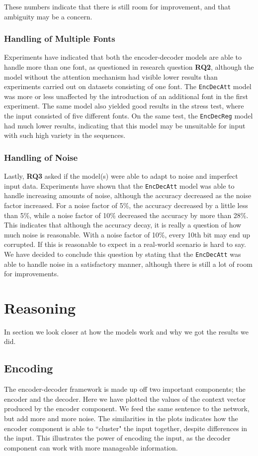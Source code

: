 These numbers indicate that there is still room for improvement, and that ambiguity may be a concern.

\subsubsection{Handling of Multiple Fonts}
Experiments have indicated that both the encoder-decoder models are able to handle more than one font, as questioned in research question \textbf{RQ2}, although the model without the attention mechanism had visible lower results than experiments carried out on datasets consisting of one font. The {\tt EncDecAtt} model was more or less unaffected by the introduction of an additional font in the first experiment. The same model also yielded good results in the stress test, where the input consisted of five different fonts. On the same test, the {\tt EncDecReg} model had much lower results, indicating that this model may be unsuitable for input with such high variety in the sequences.

\subsubsection{Handling of Noise}
Lastly, \textbf{RQ3} asked if the model(s) were able to adapt to noise and imperfect input data. Experiments have shown that the {\tt EncDecAtt} model was able to handle increasing amounts of noise, although the accuracy decreased as the noise factor increased. For a noise factor of 5\%, the accuracy decreased by a little less than 5\%, while a noise factor of 10\% decreased the accuracy by more than 28\%. This indicates that although the accuracy decay, it is really a question of how much noise is reasonable. With a noise factor of 10\%, every 10th bit may end up corrupted. If this is reasonable to expect in a real-world scenario is hard to say. We have decided to conclude this question by stating that the {\tt EncDecAtt} was able to handle noise in a satisfactory manner, although there is still a lot of room for improvements.


\section{Reasoning}
\label{sec:reasoning}
In section we look closer at how the models work and why we got the results we did. 

\subsection{Encoding}
The encoder-decoder framework is made up off two important components; the encoder and the decoder. Here we have plotted the values of the context vector produced by the encoder component. We feed the same sentence to the network, but add more and more noise. The similarities in the plots indicates how the encoder component is able to ``cluster" the input together, despite differences in the input. This illustrates the power of encoding the input, as the decoder component can work with more manageable information.

